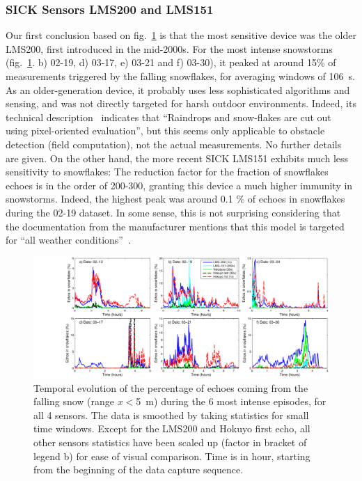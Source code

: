 \subsubsection{SICK Sensors LMS200 and LMS151}
Our first conclusion based on fig.~\ref{fig:TimingSnow} is that the most sensitive device was the older LMS200, first introduced in the mid-2000s. For the most intense snowstorms (fig.~\ref{fig:TimingSnow}. b) 02-19, d) 03-17, e) 03-21 and f) 03-30), it peaked at around 15\% of measurements triggered by the falling snowflakes, for averaging windows of \SI{106}{\second}. As an older-generation device, it probably uses less sophisticated algorithms and sensing, and was not directly targeted for harsh outdoor environments. Indeed, its technical description~\cite{LMS200Manual} indicates that ``Raindrops and snow-flakes are cut out using pixel-oriented evaluation'', but this seems only applicable to obstacle detection (field computation), not the actual measurements. No further details are given. On the other hand, the more recent SICK LMS151 exhibits much less sensitivity to snowflakes: The reduction factor for the fraction of snowflakes echoes is in the order of 200-300, granting this device a much higher immunity in snowstorms. Indeed, the highest peak was around 0.1 \% of echoes in snowflakes during the 02-19 dataset. In some sense, this is not surprising considering that the documentation from the manufacturer mentions that this model is targeted for ``all weather conditions''~\cite{LMS151Manual}.


\begin{figure}[th]
    \centering
    \includegraphics[trim={3.2cm 0 0 0},clip,width=0.97\linewidth]{./img/Timings.pdf}
    \caption{Temporal evolution of the percentage of echoes coming from the falling snow (range $x<$\SI{5}{\meter}) during the 6 most intense episodes, for all 4 sensors. The data is smoothed by taking statistics for small time windows. Except for the LMS200 and Hokuyo first echo, all other sensors statistics have been scaled up (factor in bracket of legend b) for ease of visual comparison. Time is in hour, starting from the beginning of the data capture sequence.}
    \label{fig:TimingSnow}
\end{figure}


